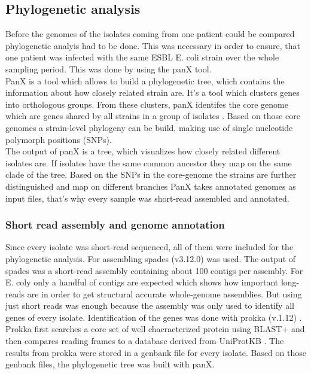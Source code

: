 \subsection{Phylogenetic analysis}
Before the genomes of the isolates coming from one patient could be compared phylogenetic analyis had to be done.
This was necessary in order to ensure, that one patient was infected with the same ESBL E. coli strain over the whole sampling period. This was done by using the panX tool.\\
PanX is a tool which allows to build a phylogenetic tree, which contains the information about how closely related strain are. It's a tool which clusters genes into orthologous groups. From these clusters, panX identifes the core genome which are genes shared by all strains in a group of isolates \cite{ding_panx:_2018}. Based on those core genomes a strain-level phylogeny can be build, making use of single nucleotide polymorph positions (SNPs). \\ 
The output of panX is a tree, which visualizes how closely related different isolates are. If isolates have the same common ancestor they map on the same clade of the tree. Based on the SNPs in the core-genome  the strains are further distinguished and map on different branches
PanX takes annotated genomes as input files, that's why every sample was short-read assembled and annotated.

\subsubsection{Short read assembly and genome annotation}
Since every isolate was short-read sequenced, all of them were included for the phylogenetic analysis. For assembling spades (v3.12.0) \cite{nurk_assembling_2013} was used. The output of spades was a short-read assembly containing about 100 contigs per assembly. For E. coly only a handful of contigs are expected which shows how important long-reads are in order to get structural accurate whole-genome assemblies. But using just short reads was enough because the assembly was only used to identify all genes of every isolate.
Identification of the genes was done with prokka (v.1.12) \cite{seemann_prokka:_2014}. Prokka first searches a core set of well chacracterized protein using BLAST+ and then compares reading frames to a database derived from UniProtKB \cite{seemann_:zap:_2019}. The results from prokka were stored in a genbank file for every isolate. Based on those genbank files, the phylogenetic tree was built with panX. 
\label{section:annotation}

